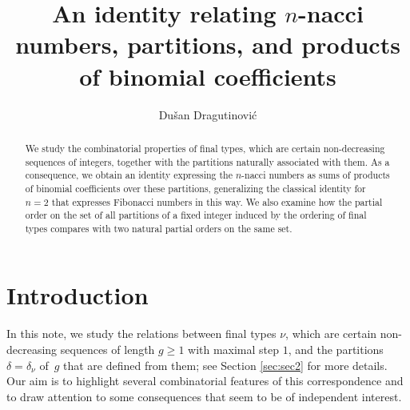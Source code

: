 \documentclass[11pt]{amsart}
\numberwithin{equation}{section}
\theoremstyle{plain}
\newcommand{\<}{\left \langle}
\renewcommand{\>}{\right \rangle}
\theoremstyle{definition}
\theoremstyle{remark}
\begin{document}
\author{Du\v san Dragutinovi\'c}
\address{}

\title[$n$-nacci numbers, partitions, and binomial coefficients]{An identity relating $n$-nacci numbers, partitions, and products of binomial coefficients}

\maketitle

\begin{abstract}
We study the combinatorial properties of final types, which are certain non-decreasing sequences of integers, together with the partitions naturally associated with them. As a consequence, we obtain an identity expressing the $n$-nacci numbers as sums of products of binomial coefficients over these partitions, generalizing the classical identity for $n = 2$ that expresses Fibonacci numbers in this way. We also examine how the partial order on the set of all partitions of a fixed integer induced by the ordering of final types compares with two natural partial orders on the same set.
\end{abstract}


\section{Introduction}
\label{sec:intro}
In this note, we study the relations between final types $\nu$, which are certain non-decreasing sequences of length $g\geq 1$ with maximal step $1$, and the partitions $\delta = \delta_{\nu}$ of~$g$ that are defined from them; see Section \ref{sec:sec2} for more details. Our aim is to highlight several combinatorial features of this correspondence and to draw attention to some consequences that seem to be of independent interest.
\end{document}
